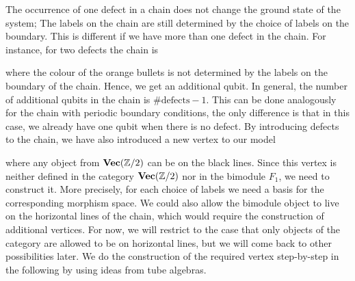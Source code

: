 The occurrence of one defect in a chain does not change the ground state of the system; The labels on the chain are still determined by the choice of labels on the boundary. This is different if we have more than one defect in the chain. For instance, for two defects the chain is
	\begin{figure}[H]
	\end{figure}
\noindent
where the colour of the orange bullets is not determined by the labels on the boundary of the chain. Hence, we get an additional qubit. In general, the number of additional qubits in the chain is $\#\mathrm{defects}-1$. This can be done analogously for the chain with periodic boundary conditions, the only difference is that in this case, we already have one qubit when there is no defect. By introducing defects to the chain, we have also introduced a new vertex to our model
	\begin{figure}[H]	
	\end{figure}
\noindent
where any object from $\textbf{Vec}(\mathbb{Z}/2)$ can be on the black lines. Since this vertex is neither defined in the category $\textbf{Vec}(\mathbb{Z}/2)$ nor in the bimodule $F_1$, we need to construct it. More precisely, for each choice of labels we need a basis for the corresponding morphism space. We could also allow the bimodule object to live on the horizontal lines of the chain, which would require the construction of additional vertices. For now, we will restrict to the case that only objects of the category are allowed to be on horizontal lines, but we will come back to other possibilities later. We do the construction of the required vertex step-by-step in the following by using ideas from tube algebras. 

